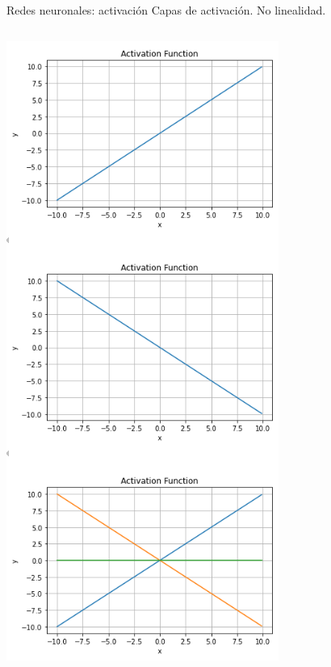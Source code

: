 \begin{frame}{Redes neuronales: activación}
Capas de activación. No linealidad.

\begin{columns}[c]
\centering
\begin{column}{0.3\textwidth}
    \centering
    \includegraphics[width=\textwidth]{figures/Introduccion/combilineal.png}

\end{column}
\end{columns}
\end{frame}
